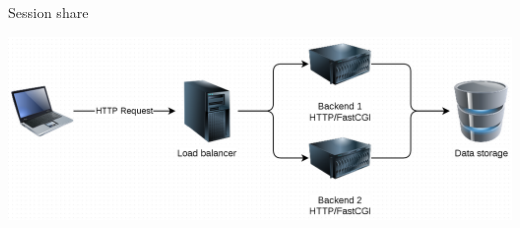 \begin{frame}{Session share}
  \begin{center}
    \includegraphics[width=\textwidth,keepaspectratio]{sources/images/lb_session_share.png}
  \end{center}
\end{frame}